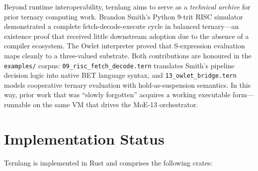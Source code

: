 \documentclass[11pt,a4paper]{article}
\begin{document}
Beyond runtime interoperability, ternlang aims to serve as a
\emph{technical archive} for prior ternary computing work.
Brandon Smith's Python 9-trit RISC simulator demonstrated a complete
fetch-decode-execute cycle in balanced ternary—an existence proof that
received little downstream adoption due to the absence of a compiler
ecosystem. The Owlet interpreter proved that S-expression evaluation maps
cleanly to a three-valued substrate. Both contributions are honoured in
the \texttt{examples/} corpus: \texttt{09\_risc\_fetch\_decode.tern}
translates Smith's pipeline decision logic into native BET language syntax,
and \texttt{13\_owlet\_bridge.tern} models cooperative ternary evaluation
with hold-as-suspension semantics. In this way, prior work that was
``slowly forgotten'' acquires a working executable form—runnable on the
same VM that drives the MoE-13 orchestrator.

\section{Implementation Status}
\label{sec:status}

Ternlang is implemented in Rust and comprises the following crates:
\end{document}
